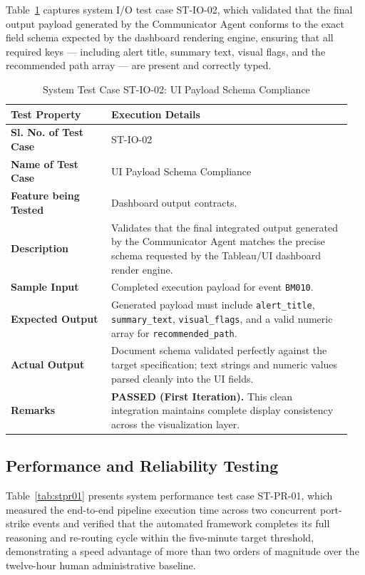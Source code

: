Table~\ref{tab:stio02} captures system I/O test case ST-IO-02, which validated that the final output payload generated by the Communicator Agent conforms to the exact field schema expected by the dashboard rendering engine, ensuring that all required keys — including alert title, summary text, visual flags, and the recommended path array — are present and correctly typed.

\begin{table}[H]
    \centering
    \caption{System Test Case ST-IO-02: UI Payload Schema Compliance}
    \label{tab:stio02}
    \begin{tabular}{|p{0.28\linewidth}|p{0.67\linewidth}|}
        \hline
        \textbf{Test Property} & \textbf{Execution Details} \\ \hline
        \textbf{Sl. No. of Test Case} & ST-IO-02 \\ \hline
        \textbf{Name of Test Case} & UI Payload Schema Compliance \\ \hline
        \textbf{Feature being Tested} & Dashboard output contracts. \\ \hline
        \textbf{Description} & Validates that the final integrated output generated by the Communicator Agent matches the precise schema requested by the Tableau/UI dashboard render engine. \\ \hline
        \textbf{Sample Input} & Completed execution payload for event \texttt{BM010}. \\ \hline
        \textbf{Expected Output} & Generated payload must include \texttt{alert\_title}, \texttt{summary\_text}, \texttt{visual\_flags}, and a valid numeric array for \texttt{recommended\_path}. \\ \hline
        \textbf{Actual Output} & Document schema validated perfectly against the target specification; text strings and numeric values parsed cleanly into the UI fields. \\ \hline
        \textbf{Remarks} & \textbf{PASSED (First Iteration).} This clean integration maintains complete display consistency across the visualization layer. \\ \hline
    \end{tabular}
\end{table}

\subsection{Performance and Reliability Testing}
Table~\ref{tab:stpr01} presents system performance test case ST-PR-01, which measured the end-to-end pipeline execution time across two concurrent port-strike events and verified that the automated framework completes its full reasoning and re-routing cycle within the five-minute target threshold, demonstrating a speed advantage of more than two orders of magnitude over the twelve-hour human administrative baseline.

